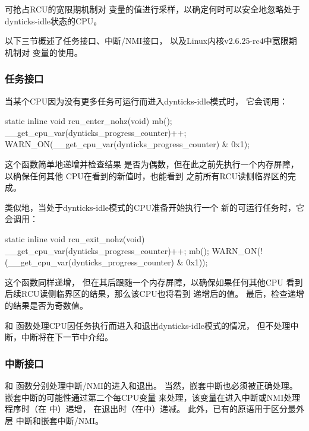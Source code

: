 可抢占RCU的宽限期机制对
变量的值进行采样，以确定何时可以安全地忽略处于
dynticks-idle状态的CPU。

以下三节概述了任务接口、中断/NMI接口，
以及Linux内核v2.6.25-rc4中宽限期机制对
变量的使用。

\subsubsection{任务接口}
\label{sec:formal:Task Interface}

当某个CPU因为没有更多任务可运行而进入dynticks-idle模式时，
它会调用：

\begin{VerbatimN}
static inline void rcu_enter_nohz(void)
{
	mb();
	__get_cpu_var(dynticks_progress_counter)++;
	WARN_ON(__get_cpu_var(dynticks_progress_counter) &
	        0x1);
}
\end{VerbatimN}

这个函数简单地递增并检查结果
是否为偶数，但在此之前先执行一个内存屏障，以确保任何其他
CPU在看到的新值时，也能看到
之前所有RCU读侧临界区的完成。

类似地，当处于dynticks-idle模式的CPU准备开始执行一个
新的可运行任务时，它会调用：

\begin{VerbatimN}
static inline void rcu_exit_nohz(void)
{
	__get_cpu_var(dynticks_progress_counter)++;
	mb();
	WARN_ON(!(__get_cpu_var(dynticks_progress_counter) &
	          0x1));
}
\end{VerbatimN}

这个函数同样递增，
但在其后跟随一个内存屏障，以确保如果任何其他CPU
看到后续RCU读侧临界区的结果，那么该CPU也将看到
递增后的值。
最后，检查递增的结果是否为奇数值。

和
函数处理CPU因任务执行而进入和退出dynticks-idle模式的情况，
但不处理中断，中断将在下一节中介绍。

\subsubsection{中断接口}
\label{sec:formal:Interrupt Interface}

和
函数分别处理中断/NMI的进入和退出。
当然，嵌套中断也必须被正确处理。
嵌套中断的可能性通过第二个每CPU变量
来处理，该变量在进入中断或NMI处理程序时（在
中）递增，
在退出时（在中）递减。
此外，已有的原语用于区分最外层
中断和嵌套中断/NMI\@。

